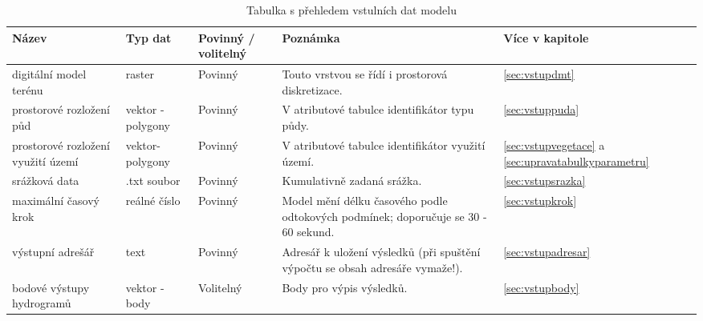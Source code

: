
% 
\begin{sidewaystable}
\centering
\caption{Tabulka s přehledem vstulních dat modelu}
\label{tab:vstupy}
\small{
\begin{tabular}{p{}lp{}p{}l}
\hline \hline
Název                              & Typ dat                       & Povinný / volitelný & Poznámka                                                                                      & Více v kapitole                                                 \\ \hline 
digitální model terénu             & raster                        & Povinný           & Touto vrstvou se řídí i prostorová diskretizace.                                                 & \ref{sec:vstupdmt}                                           \\ 
prostorové rozložení půd           & vektor - polygony             & Povinný           & V atributové tabulce identifikátor typu půdy.                                               & \ref{sec:vstuppuda}                                          \\ 
prostorové rozložení využití území & vektor- polygony              & Povinný           & V atributové tabulce identifikátor využití území.                                           & \ref{sec:vstupvegetace} a \ref{sec:upravatabulkyparametru}   \\ 
srážková data                      & .txt soubor                   & Povinný           & Kumulativně zadaná srážka.                                                                       & \ref{sec:vstupsrazka}                                        \\ 
maximální časový krok              & reálné číslo                  & Povinný           & Model mění délku časového podle odtokových podmínek; doporučuje se 30 - 60 sekund.               & \ref{sec:vstupkrok}                                          \\ 
výstupní adrešář                   & text                          & Povinný           & Adresář k uložení výsledků (při spuštění výpočtu se obsah adresáře vymaže!).                            & \ref{sec:vstupadresar}                                       \\ 
bodové výstupy hydrogramů          & vektor - body                 & Volitelný         & Body pro výpis výsledků.                                                                   & \ref{sec:vstupbody}                                          \\ 

\end{tabular}}
\end{sidewaystable}
